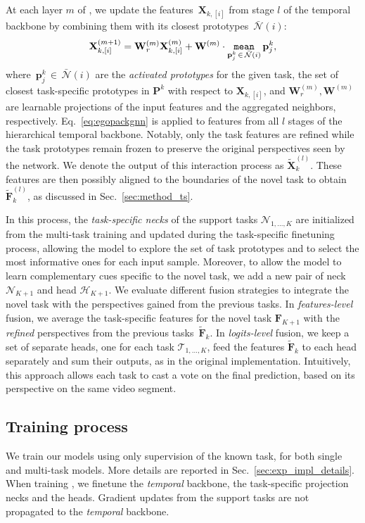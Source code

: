 At each layer $m$ of \ours, we update the features~$\mathbf{X}_{k,[i]}$ from stage $l$ of the temporal backbone by combining them with its closest prototypes~$\bar{\mathcal{N}}(i)$:
\begin{equation}
    \mathbf{X}^{(m+1)}_{k,[i]} = \mathbf{W}^{(m)}_{r} \mathbf{X}^{(m)}_{k,[i]} + \mathbf{W}^{(m)} \cdot  \operatorname*{\mathtt{mean}}_{\mathbf{p}^k_{j} \, \in \, \bar{\mathcal{N}}(i)} \mathbf{p}^k_{j},
\end{equation}\label{eq:egopackgnn}
where~$\mathbf{p}^k_{j} \, \in \, \bar{\mathcal{N}}(i)$ are the \emph{activated prototypes} for the given task, \ie the set of closest task-specific prototypes in $\mathbf{P}^k$ with respect to $\mathbf{X}_{k,[i]}$, and $\mathbf{W}^{(m)}_{r},\mathbf{W}^{(m)}$ are learnable projections of the input features and the aggregated neighbors, respectively. Eq.~\ref{eq:egopackgnn} is applied to features from all $l$ stages of the hierarchical temporal backbone.
Notably, only the task features are refined while the task prototypes remain frozen to preserve the original perspectives seen by the network.
We denote the output of this interaction process as $\tilde{\mathbf{X}}^{(l)}_k$.
These features are then possibly aligned to the boundaries of the novel task to obtain $\tilde{\mathbf{F}}^{(l)}_k$, as discussed in Sec.~\ref{sec:method_ts}.

In this process, the \emph{task-specific necks} of the support tasks $\mathcal{N}_{1,\dots,K}$ are initialized from the multi-task training and updated during the task-specific finetuning process, allowing the model to explore the set of task prototypes and to select the most informative ones for each input sample.
Moreover, to allow the model to learn complementary cues specific to the novel task, we add a new pair of neck $\mathcal{N}_{K+1}$ and head $\mathcal{H}_{K+1}$.
We evaluate different fusion strategies to integrate the novel task with the perspectives gained from the previous tasks.
In \emph{features-level} fusion, we average the task-specific features for the novel task $\mathbf{F}_{K+1}$ with the \textit{refined} perspectives from the previous tasks~$\tilde{\mathbf{F}}_k$.
In \emph{logits-level} fusion, we keep a set of separate heads, one for each task $\mathcal{T}_{1,\dots,K}$, feed the features $\tilde{\mathbf{F}}_k$ to each head separately and sum their outputs, as in the original \ourscvpr implementation.
Intuitively, this approach allows each task to cast a vote on the final prediction, based on its perspective on the same video segment.

\subsection{Training process}
We train our models using only supervision of the known task, for both single and multi-task models. More details are reported in Sec.~\ref{sec:exp_impl_details}.
When training \ours, we finetune the \emph{temporal} backbone, the task-specific projection necks and the heads. Gradient updates from the support tasks are not propagated to the \emph{temporal} backbone.